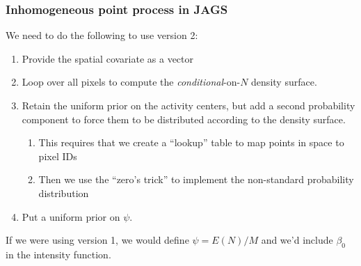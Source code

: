 \documentclass[color=usenames,dvipsnames]{beamer}\usepackage[]{graphicx}\usepackage[]{color}
\begin{document}
\begin{frame}
  \frametitle{Inhomogeneous point process in JAGS}
  We need to do the following to use version 2:
  \begin{enumerate}
    \item Provide the spatial covariate as a vector
    \item Loop over all pixels to compute the {\it conditional}-on-$N$
      density surface. 
    \item Retain the uniform prior on the activity centers, but add a
      second probability component to force them to be distributed
      according to the density surface.
      \begin{enumerate}
        \item This requires that we create a ``lookup'' table to map
          points in space to pixel IDs
        \item Then we use the ``zero's trick'' to implement the
          non-standard probability distribution
      \end{enumerate}
    \item Put a uniform prior on $\psi$.
  \end{enumerate}
  \pause
  \vfill
  If we were using version 1, we would define $\psi=E(N)/M$ and we'd
  include $\beta_0$ in the intensity function.
\end{frame}
\end{document}
